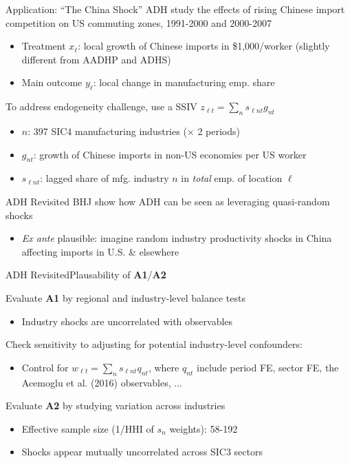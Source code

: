 \documentclass[t]{beamer}
\begin{document}
\begin{frame}{Application: ``The China Shock''} 
ADH study the effects of rising Chinese import competition on US commuting zones, 1991-2000 and 2000-2007
\smallskip
	\begin{itemize}
	\item Treatment $x_\ell$: local growth of Chinese imports  in \$1,000/worker (slightly different from AADHP and ADHS)\smallskip
	\item Main outcome $y_\ell$: local change in manufacturing emp. share
	\end{itemize}
	\pause\medskip
To address endogeneity challenge, use a SSIV $z_{\ell t}=\sum_n s_{\ell nt} g_{nt}$\smallskip
	\begin{itemize}
	\item $n$: 397 SIC4 manufacturing industries ($\times$ 2 periods)\smallskip
	\item $g_{nt}$: growth of Chinese imports in non-US economies per US worker \smallskip
	\item $s_{\ell nt}$: lagged share of mfg. industry $n$ in \emph{total} emp. of location $\ell$
	\end{itemize}
\end{frame}

\begin{frame}{ADH Revisited}
BHJ show how ADH can be seen as leveraging quasi-random shocks\smallskip
\begin{itemize}
	\item \emph{Ex ante} plausible: imagine random industry productivity shocks in China affecting imports in U.S. \& elsewhere
\end{itemize}

\end{frame}

\begin{frame}{ADH Revisited}{Plausability of \textbf{A1}/\textbf{A2}}

Evaluate \textbf{A1} by regional and industry-level balance tests\smallskip
\begin{itemize}
	\item Industry shocks are uncorrelated with observables
\end{itemize}

\smallskip\pause
Check sensitivity to adjusting for potential industry-level confounders:
\begin{itemize}
	\item Control for $w_{\ell t}=\sum_n s_{\ell nt} q_{nt}$, where $q_{nt}$ include period FE, sector FE, the Acemoglu et al. (2016) observables, ...
\end{itemize}
\medskip\pause

Evaluate \textbf{A2} by studying variation across industries\smallskip
	\begin{itemize}
	\item Effective sample size (1/HHI of $s_n$ weights): 58-192\smallskip
	\item Shocks appear mutually uncorrelated across SIC3 sectors
	\end{itemize}
\end{frame} 
\end{document}
